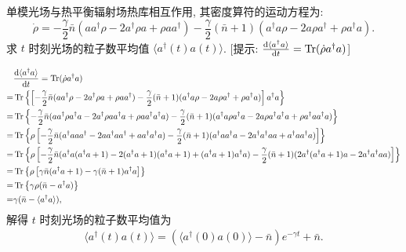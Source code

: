 \documentclass{assignment}
\begin{document}
\begin{prob}
    单模光场与热平衡辐射场热库相互作用, 其密度算符的运动方程为:
    \[
        \dot{\rho}=-\frac{\gamma}{2}\bar{n}(aa^{\dagger}\rho-2a^{\dagger}\rho a+\rho aa^{\dagger})-\frac{\gamma}{2}(\bar{n}+1)(a^{\dagger}a\rho-2a\rho a^{\dagger}+\rho a^{\dagger}a).
    \]
    求 $t$ 时刻光场的粒子数平均值 $\langle a^{\dagger}(t)a(t)\rangle$. [提示: $\frac{\mathrm{d}\langle a^{\dagger}a\rangle}{\mathrm{d}t}=\operatorname{Tr}(\dot{\rho}a^{\dagger}a)$]
\end{prob}
\begin{sol}
    \begin{align}
        \notag&\frac{\mathrm{d}\langle a^{\dagger}a\rangle}{\mathrm{d}t}=\operatorname{Tr}(\dot{\rho}a^{\dagger}a)\\
        \notag=&\operatorname{Tr}\left\{\left[-\frac{\gamma}{2}\bar{n}(aa^{\dagger}\rho-2a^{\dagger}\rho a+\rho aa^{\dagger})-\frac{\gamma}{2}(\bar{n}+1)(a^{\dagger}a\rho-2a\rho a^{\dagger}+\rho a^{\dagger}a)\right]a^{\dagger}a\right\}\\
        \notag=&\operatorname{Tr}\left\{-\frac{\gamma}{2}\bar{n}(aa^{\dagger}\rho a^{\dagger}a-2a^{\dagger}\rho aa^{\dagger}a+\rho aa^{\dagger}a^{\dagger}a)-\frac{\gamma}{2}(\bar{n}+1)(a^{\dagger}a\rho a^{\dagger}a-2a\rho a^{\dagger}a^{\dagger}a+\rho a^{\dagger}aa^{\dagger}a)\right\}\\
        \notag=&\operatorname{Tr}\left\{\rho\left[-\frac{\gamma}{2}\bar{n}(a^{\dagger}aaa^{\dagger}-2aa^{\dagger}aa^{\dagger}+aa^{\dagger}a^{\dagger}a)-\frac{\gamma}{2}(\bar{n}+1)(a^{\dagger}aa^{\dagger}a-2a^{\dagger}a^{\dagger}aa+a^{\dagger}aa^{\dagger}a)\right]\right\}\\
        \notag=&\operatorname{Tr}\left\{\rho\left[-\frac{\gamma}{2}\bar{n}(a^{\dagger}a(a^{\dagger}a+1)-2(a^{\dagger}a+1)(a^{\dagger}a+1)+(a^{\dagger}a+1)a^{\dagger}a)-\frac{\gamma}{2}(\bar{n}+1)(2a^{\dagger}(a^{\dagger}a+1)a-2a^{\dagger}a^{\dagger}aa)\right]\right\}\\
        \notag=&\operatorname{Tr}\left\{\rho\left[\gamma\bar{n}(a^{\dagger}a+1)-\gamma(\bar{n}+1)a^{\dagger}a\right]\right\}\\
        \notag=&\operatorname{Tr}\left\{\gamma\rho(\bar{n}-a^{\dagger}a)\right\}\\
        =&\gamma(\bar{n}-\langle a^{\dagger}a\rangle),
    \end{align}
    解得 $t$ 时刻光场的粒子数平均值为
    \begin{align}
        \langle a^{\dagger}(t)a(t)\rangle=(\langle a^{\dagger}(0)a(0)\rangle-\bar{n})e^{-\gamma t}+\bar{n}.
    \end{align}
\end{sol}
\end{document}
